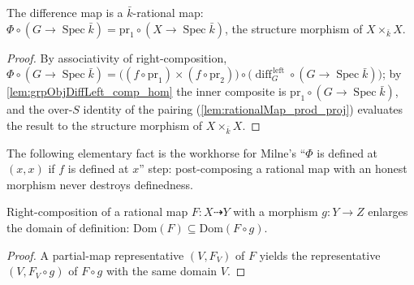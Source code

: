 \begin{lemma}\leanok
  \label{lem:rationalMap_difference_over}
  The difference map is a \(\bar k\)-rational map: \(\Phi \circ (G \to \operatorname{Spec}\bar k)
  = \mathrm{pr}_1 \circ (X \to \operatorname{Spec}\bar k)\), the structure morphism of
  \(X \times_{\bar k} X\).
\end{lemma}
\begin{proof}\leanok
  By associativity of right-composition, \(\Phi \circ (G \to \operatorname{Spec}\bar k) =
  \bigl((f \circ \mathrm{pr}_1) \times (f \circ \mathrm{pr}_2)\bigr) \circ
  \bigl(\operatorname{diff}_G^{\,\mathrm{left}} \circ (G \to \operatorname{Spec}\bar k)\bigr)\);
  by \cref{lem:grpObjDiffLeft_comp_hom} the inner composite is
  \(\mathrm{pr}_1 \circ (G \to \operatorname{Spec}\bar k)\), and the over-\(S\) identity of the
  pairing (\cref{lem:rationalMap_prod_proj}) evaluates the result to the structure morphism of
  \(X \times_{\bar k} X\).
\end{proof}

The following elementary fact is the workhorse for Milne's ``\(\Phi\) is defined at
\((x,x)\) if \(f\) is defined at \(x\)'' step: post-composing a rational map with an
honest morphism never destroys definedness.

\begin{lemma}\leanok
  \label{lem:compHom_domain_monotone}
  Right-composition of a rational map \(F \colon X \dashrightarrow Y\) with a morphism
  \(g \colon Y \to Z\) enlarges the domain of definition:
  \(\mathrm{Dom}(F) \subseteq \mathrm{Dom}(F \circ g)\).
\end{lemma}
\begin{proof}\leanok
  A partial-map representative \((V, F_V)\) of \(F\) yields the representative
  \((V, F_V \circ g)\) of \(F \circ g\) with the same domain \(V\).
\end{proof}

